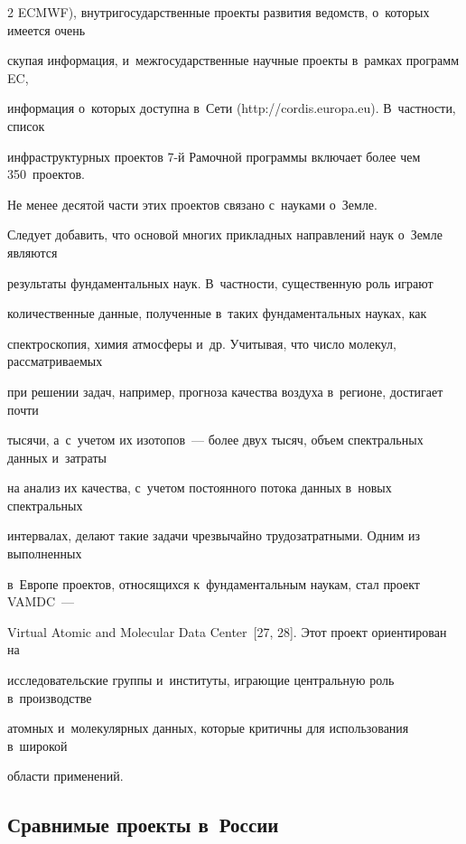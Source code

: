 \begin{multicols}{2}
ECMWF), внутригосударственные проекты развития ведомств, о~которых имеется очень 


скупая информация, и~межгосударственные научные проекты в~рамках программ EC, 


информация о~которых доступна в~Сети ({\sf http://cordis.europa.eu}). В~частности, список 


инфраструктурных проектов 7-й Рамочной программы включает более чем 350~проектов. 


Не менее десятой части этих проектов связано с~науками о~Земле. 


  


  Следует добавить, что основой многих прикладных направлений наук о~Земле являются 


результаты фундаментальных наук. В~частности, существенную роль играют 


количественные данные, полученные в~таких фундаментальных науках, как 


спектроскопия, химия атмосферы и~др. Учитывая, что число молекул, рассматриваемых 


при решении задач, например, прогноза качества воздуха в~регионе, достигает почти 


тысячи, а~с~учетом их изотопов~--- более двух тысяч, объем спектральных данных и~затраты 


на анализ их качества, с~учетом постоянного потока данных в~новых спектральных 


интервалах, делают такие задачи чрезвычайно трудозатратными. Одним из выполненных 


в~Европе проектов, относящихся к~фундаментальным наукам, стал проект VAMDC~--- 


Virtual Atomic and Molecular Data Center~[27, 28]. Этот проект ориентирован на 


исследовательские группы и~институты, играющие центральную роль в~производстве 


атомных и~молекулярных данных, которые критичны для использования в~широкой 


области применений. 


  


\subsection{Сравнимые проекты в~России}






\end{multicols}
